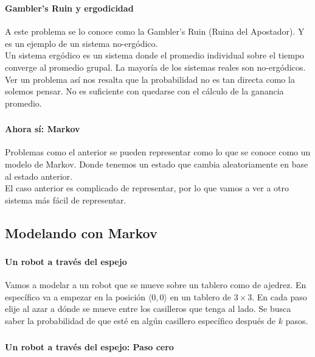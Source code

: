 \documentclass{beamer}
\newcommand{\chess}[1]{\chessboard[addpieces={R#1}]}
\newcommand{\tchess}[1]{\chessboard[tinyboard, addpieces={R#1}]}
\newcommand{\GVertex}[4]{\Vertex[L=#1,x=#2,y=#3]{#4}}
\newcommand{\CVertex}[4]{\GVertex{\tchess{#1}}{#2}{#3}{#4}}
\begin{document}
\begin{frame}
  \frametitle{\SECTIONC}
  \framesubtitle{Gambler's Ruin y ergodicidad}

  A este problema se lo conoce como la Gambler's Ruin (Ruina del Apostador). Y es un ejemplo de un sistema no-ergódico. \pause \\
  Un sistema ergódico es un sistema donde el promedio individual sobre el tiempo converge al promedio grupal. \pause La mayoría de los sistemas reales son no-ergódicos. \pause \\
  Ver un problema así nos resalta que la probabilidad no es tan directa como la solemos pensar. No es suficiente con quedarse con el cálculo de la ganancia promedio.
\end{frame}

\begin{frame}
  \frametitle{\SECTIONC}
  \framesubtitle{Ahora sí: Markov}

  Problemas como el anterior se pueden representar como lo que se conoce como un modelo de Markov. Donde tenemos un estado que cambia aleatoriamente en base al estado anterior. \pause \\
  El caso anterior es complicado de representar, por lo que vamos a ver a otro sistema más fácil de representar.

\end{frame}

\subsection{Modelando con Markov}
\newcommand{\EJC}{Un robot a través del espejo}

\begin{frame}
  \frametitle{\SECTIONC}
  \framesubtitle{\EJC}

  Vamos a modelar a un robot que se mueve sobre un tablero como de ajedrez. \pause En específico va a empezar en la posición \(\langle 0, 0 \rangle\) en un tablero de \(3 \times 3\). En cada paso elije al azar a dónde se mueve entre los casilleros que tenga al lado. Se busca saber la probabilidad de que esté en algún casillero específico después de \(k\) pasos.

  \begin{figure}[H]
    \centering
    \chess{a1}
  \end{figure}
\end{frame}

\begin{frame}
  \frametitle{\SECTIONC}
  \framesubtitle{\EJC: Paso cero}

  \begin{figure}[H]
    \centering
    \scalebox{0.8}{
      \begin{tikzpicture}
        \CVertex{a1}{0}{0}{0}
      \end{tikzpicture}
    }
  \end{figure}
\end{frame}
\end{document}
